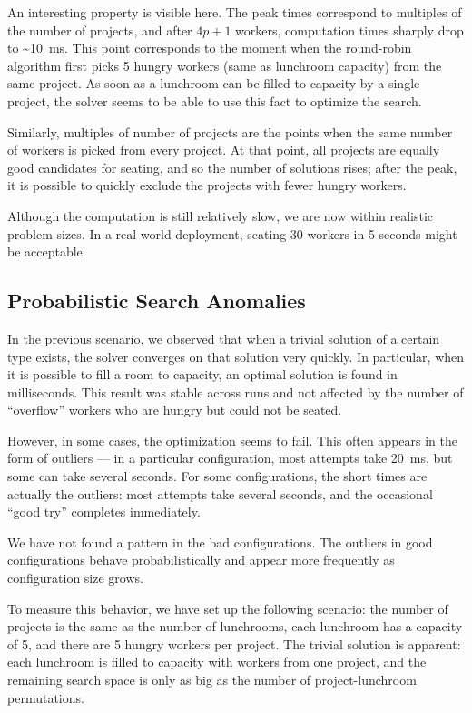 An interesting property is visible here. The peak times correspond to multiples of the
number of projects, and after $4p + 1$ workers, computation times sharply drop to
\textasciitilde{}10~ms. This point corresponds to the moment when the round-robin
algorithm first picks 5 hungry workers (same as lunchroom capacity) from the same
project. As soon as a lunchroom can be filled to capacity by a single project, the
solver seems to be able to use this fact to optimize the search.

Similarly, multiples of number of projects are the points when the same number of
workers is picked from every project. At that point, all projects are equally good
candidates for seating, and so the number of solutions rises; after the peak, it is
possible to quickly exclude the projects with fewer hungry workers.

Although the computation is still relatively slow, we are now within realistic problem
sizes. In a real-world deployment, seating 30 workers in 5 seconds might be acceptable.


\subsection{Probabilistic Search Anomalies}
\label{eval:example:badsolver}

In the previous scenario, we observed that when a trivial solution of a certain type
exists, the solver converges on that solution very quickly. In particular, when it is
possible to fill a room to capacity, an optimal solution is found in milliseconds. This
result was stable across runs and not affected by the number of ``overflow'' workers who
are hungry but could not be seated.

However, in some cases, the optimization seems to fail. This often appears in the form
of outliers --- in a particular configuration, most attempts take 20~ms, but some can
take several seconds. For some configurations, the short times are actually the
outliers: most attempts take several seconds, and the occasional ``good try'' completes
immediately.

We have not found a pattern in the bad configurations. The outliers in good
configurations behave probabilistically and appear more frequently as configuration size
grows.

To measure this behavior, we have set up the following scenario: the number of projects
is the same as the number of lunchrooms, each lunchroom has a capacity of 5, and there
are 5 hungry workers per project. The trivial solution is apparent: each lunchroom
is filled to capacity with workers from one project, and the remaining search space
is only as big as the number of project-lunchroom permutations.

